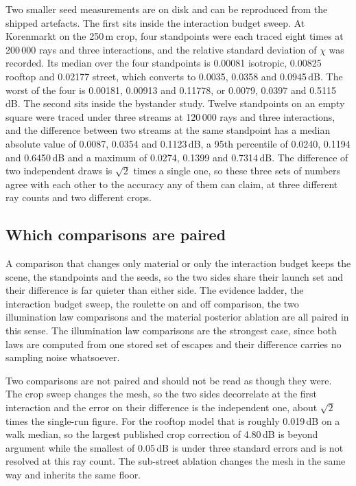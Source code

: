 \documentclass[journal]{IEEEtran}
\begin{document}
Two smaller seed measurements are on disk and can be reproduced from the shipped
artefacts. The first sits inside the interaction budget sweep. At Korenmarkt on
the 250\,m crop, four standpoints were each traced eight times at 200\,000 rays
and three interactions, and the relative standard deviation of $\chi$ was
recorded. Its median over the four standpoints is 0.00081 isotropic, 0.00825
rooftop and 0.02177 street, which converts to 0.0035, 0.0358 and 0.0945\,dB. The
worst of the four is 0.00181, 0.00913 and 0.11778, or 0.0079, 0.0397 and
0.5115\,dB. The second sits inside the bystander study. Twelve standpoints on an
empty square were traced under three streams at 120\,000 rays and three
interactions, and the difference between two streams at the same standpoint has
a median absolute value of 0.0087, 0.0354 and 0.1123\,dB, a 95th percentile of
0.0240, 0.1194 and 0.6450\,dB and a maximum of 0.0274, 0.1399 and 0.7314\,dB.
The difference of two independent draws is $\sqrt{2}$ times a single one, so
these three sets of numbers agree with each other to the accuracy any of them
can claim, at three different ray counts and two different crops.

\subsection{Which comparisons are paired}

A comparison that changes only material or only the interaction budget keeps the
scene, the standpoints and the seeds, so the two sides share their launch set
and their difference is far quieter than either side. The evidence ladder, the
interaction budget sweep, the roulette on and off comparison, the two
illumination law comparisons and the material posterior ablation are all paired
in this sense. The illumination law comparisons are the strongest case, since
both laws are computed from one stored set of escapes and their difference
carries no sampling noise whatsoever.

Two comparisons are not paired and should not be read as though they were. The
crop sweep changes the mesh, so the two sides decorrelate at the first
interaction and the error on their difference is the independent one, about
$\sqrt{2}$ times the single-run figure. For the rooftop model that is roughly
0.019\,dB on a walk median, so the largest published crop correction of 4.80\,dB
is beyond argument while the smallest of 0.05\,dB is under three standard errors
and is not resolved at this ray count. The sub-street ablation changes the mesh
in the same way and inherits the same floor.
\end{document}
